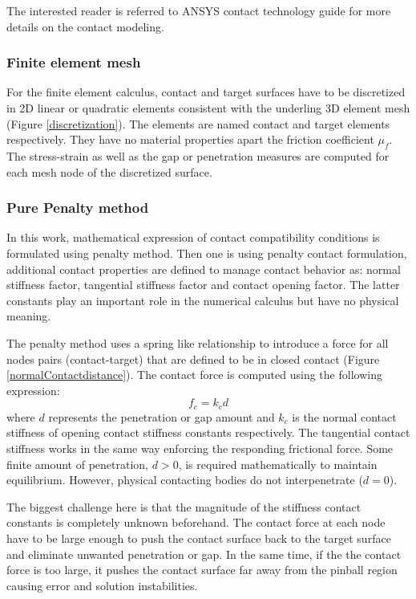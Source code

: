  The interested reader is referred to ANSYS contact technology guide for more details on the contact modeling.


\subsubsection*{Finite element mesh}
For the finite element calculus, contact and target surfaces have to be discretized in 2D linear or quadratic elements consistent with the underling 3D element mesh (Figure \ref{discretization}). The elements are named contact and target elements respectively.  They have no material properties apart the friction coefficient $\mu_f$. The stress-strain as well as the gap or penetration measures are computed for each mesh node of the discretized surface.

\subsubsection*{Pure Penalty method}
In this work, mathematical expression of contact compatibility conditions is formulated using penalty method. Then one is using penalty contact formulation, additional contact properties are defined to manage contact behavior as: normal stiffness factor, tangential stiffness factor and contact opening factor. The latter constants play an important role in the numerical calculus but have no physical meaning.

The penalty method uses a spring like relationship to introduce a force for all nodes pairs (contact-target) that are defined to be in closed contact (Figure \ref{normalContactdistance}). The contact force is computed using the following expression:
\begin{equation}
f_c = k_c d
\end{equation}
where $d$ represents the penetration or gap amount and $k_c$ is the normal contact stiffness of opening contact stiffness constants respectively. The tangential contact stiffness works in the same way enforcing the responding frictional force. Some finite amount of penetration, $d > 0$, is required mathematically to maintain 	equilibrium. However, physical contacting bodies do not interpenetrate ($d = 0$). 
 
 The biggest challenge here is that the magnitude of the stiffness contact constants is completely unknown beforehand. The contact force at each node have to be large enough to push the contact surface back to the target surface and eliminate unwanted penetration or gap. In the same time, if the the contact force is too large, it pushes the contact surface far away from the pinball region causing error and solution instabilities.

